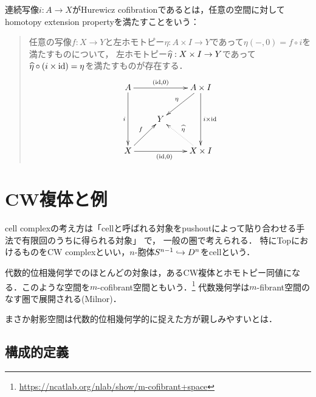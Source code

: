 \documentclass[uplatex,dvipdfmx]{jsreport}
\begin{document}
\begin{definition}
    連続写像$i:A\to X$がHurewicz cofibrationであるとは，任意の空間に対してhomotopy extension propertyを満たすことをいう：
    \begin{quote}
        任意の写像$f:X\to Y$と左ホモトピー$\eta:A\times I\to Y$であって$\eta(-,0)=f\circ i$を満たすものについて，
        左ホモトピー$\widehat{\eta}:X\times I\to Y$であって$\widehat{\eta}\circ(i\times\mathrm{id})=\eta$を満たすものが存在する．
        \[\xymatrix{
            A\ar[rr]^-{(\id,0)}\ar[dd]_-i&&A\times I\ar[dd]^-{i\times\id}\ar[dl]_-\eta\\
            &Y\\
            X\ar[ur]^-f\ar[rr]_{(\id,0)}&&X\times I\ar@{.>}[ul]_-{\wh{\eta}}
        }\]
    \end{quote}
\end{definition}

\section{CW複体と例}

\begin{tcolorbox}[colframe=ForestGreen, colback=ForestGreen!10!white,breakable,colbacktitle=ForestGreen!40!white,coltitle=black,fonttitle=\bfseries\sffamily,
title=組み合わせ論的に扱いやすく，強い普遍性を備えた対象]
    cell complexの考え方は「cellと呼ばれる対象をpushoutによって貼り合わせる手法で有限回のうちに得られる対象」
    で，
    一般の圏で考えられる．
    特にTopにおけるものをCW complexといい，$n$-胞体$S^{n-1}\hookrightarrow D^n$をcellという．

    代数的位相幾何学でのほとんどの対象は，あるCW複体とホモトピー同値になる．このような空間を$m$-cofibrant空間ともいう．\footnote{\url{https://ncatlab.org/nlab/show/m-cofibrant+space}}
    代数幾何学は$m$-fibrant空間のなす圏で展開される(Milnor)．

    まさか射影空間は代数的位相幾何学的に捉えた方が親しみやすいとは．
\end{tcolorbox}

\subsection{構成的定義}
\end{document}
